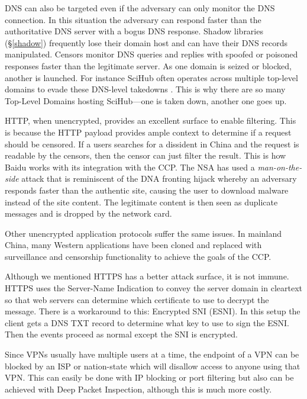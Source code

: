 DNS can also be targeted even if the adversary can only monitor the DNS
connection. In this situation the adversary can respond faster than the
authoritative DNS server with a bogus DNS response.\cite[p.\@
      6]{wendzelSurveyInternetCensorship2025} Shadow libraries (\S \ref{shadow})
frequently lose their domain host and can have their DNS records manipulated.
Censors monitor DNS queries and replies with spoofed or poisoned
responses faster than the legitimate server. As one domain is seized or
blocked, another is launched. For instance SciHub often operates across
multiple top-level domains to evade these DNS-level takedowns \cite{bortzmeyer2017scihub}.
This is why there are so many Top-Level Domains hosting SciHub---one is taken
down, another one goes up.

HTTP, when unencrypted, provides an excellent surface to enable filtering. This
is because the HTTP payload provides ample context to determine if a request
should be censored. If a users searches for a dissident in China and the request
is readable by the censors, then the censor can just filter the result. This is
how Baidu works with its integration with the CCP. The NSA has used a
\emph{man-on-the-side} attack that is reminiscent of the DNA fronting hijack
whereby an adversary responds faster than the authentic site, causing the user
to download malware instead of the site content. The legitimate content is then
seen as duplicate messages and is dropped by the network card.

Other unencrypted application protocols suffer the same issues. In mainland
China, many Western applications have been cloned and replaced with surveillance
and censorship functionality to achieve the goals of the CCP.

Although we mentioned HTTPS has a better attack surface, it is not immune. HTTPS
uses the Server-Name Indication to convey the server domain in cleartext so that
web servers can determine which certificate to use to decrypt the message. There
is a workaround to this: Encrypted SNI (ESNI). \cite[p.\@
      8]{wendzelSurveyInternetCensorship2025} In this setup the client gets a DNS TXT
record to determine what key to use to sign the ESNI. Then the events proceed as
normal except the SNI is encrypted.

Since VPNs usually have multiple users at a time, the endpoint of a VPN can be
blocked by an ISP or nation-state which will disallow access to anyone using
that VPN.\cite[p.\@ 8]{wendzelSurveyInternetCensorship2025} This can easily be
done with IP blocking or port filtering but also can be achieved with Deep
Packet Inspection, although this is much more costly.

